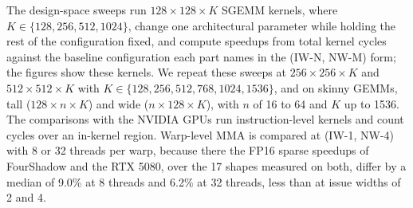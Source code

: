 The design-space sweeps run $128\times128\times K$ SGEMM kernels, where $K\in\{128,256,512,1024\}$, change one architectural parameter while holding the rest of the configuration fixed, and compute speedups from total kernel cycles against the baseline configuration each part names in the (IW-N, NW-M) form; the figures show these kernels. \label{sec:large_method}We repeat these sweeps at $256{\times}256{\times}K$ and $512{\times}512{\times}K$ with $K\in\{128,256,512,768,1024,1536\}$, and \label{sec:skinny_method}on skinny GEMMs, tall ($128{\times}n{\times}K$) and wide ($n{\times}128{\times}K$), with $n$ of 16 to 64 and $K$ up to 1536.
The comparisons with the NVIDIA GPUs run instruction-level kernels and count cycles over an in-kernel region. Warp-level MMA is compared at (IW-1, NW-4) with 8 or 32 threads per warp, because there the FP16 sparse speedups of FourShadow and the RTX 5080, over the 17 shapes measured on both, differ by a median of 9.0\% at 8 threads and 6.2\% at 32 threads, less than at issue widths of 2 and 4.
